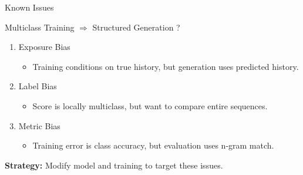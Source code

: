 

\begin{frame}{Known Issues}

  \begin{center}
    Multiclass Training $\Rightarrow$ Structured Generation ?
  \end{center}

  \pause
  \begin{enumerate}
  \item Exposure Bias
    \begin{itemize}
    \item Training conditions on true history, but generation uses predicted history.
    \end{itemize}
    \air
    \pause

  \item Label Bias  %
    \begin{itemize}
    \item Score is locally multiclass, but  want to compare entire sequences.
    \end{itemize}
    \air
    \pause


  \item Metric Bias
    \begin{itemize}
    \item Training error is class accuracy, but evaluation uses n-gram match.
    \end{itemize}
  \end{enumerate}
  \pause
  \begin{center}
    \textbf{Strategy:} Modify model and training to target these issues.
  \end{center}
\end{frame}








